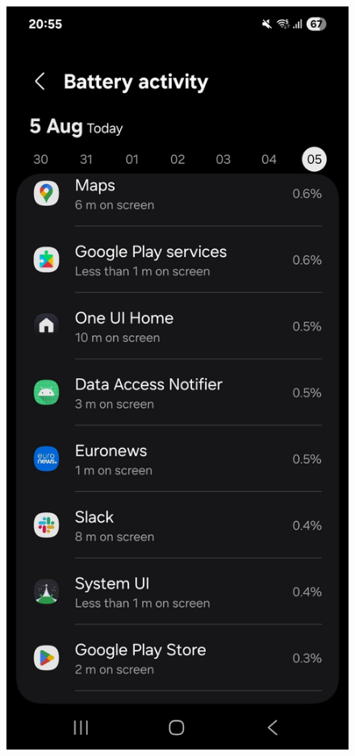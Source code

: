 \begin{figure}[H]
\centering
\begin{minipage}{0.32\textwidth}
    \centering
    \includegraphics[width=\textwidth]{english/figures/IMG_20250809_225839_242.jpg}

\end{minipage}
\end{figure}
